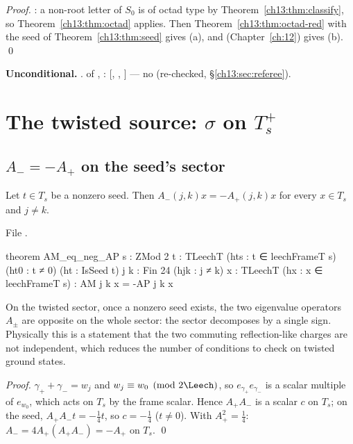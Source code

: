 \noindent\emph{Proof.} : a non-root letter of $S_0$ is of octad type by
Theorem~\ref{ch13:thm:classify}, so Theorem~\ref{ch13:thm:octad} applies. Then
Theorem~\ref{ch13:thm:octad-red} with the seed of Theorem~\ref{ch13:thm:seed} gives (a), and
 (Chapter~\ref{ch:12}) gives (b). \qed
\begin{status}
\textbf{Unconditional.} .  of ,
: [, , ] --- no 
(re-checked, \S\ref{ch13:sec:referee}).
\end{status}

\section{\texorpdfstring{The twisted source: $\sigma$ on $T_s^+$}{The twisted source: sigma on Ts+}}\label{ch13:sec:tt}

\subsection{\texorpdfstring{$A_-=-A_+$ on the seed's sector}{A-=-A+ on the seed's sector}}
\begin{lemma}\label{ch13:lem:AM-AP}
Let $t\in T_s$ be a nonzero seed. Then $A_-(j,k)x=-A_+(j,k)x$ for every $x\in T_s$ and $j\ne k$.
\end{lemma}
\noindent File .
\begin{leancode}
theorem AM_eq_neg_AP {s : ZMod 2} {t : TLeechT} (hts : t ∈ leechFrameT s) (ht0 : t ≠ 0) (ht : IsSeed t)
    {j k : Fin 24} (hjk : j ≠ k) {x : TLeechT} (hx : x ∈ leechFrameT s) : AM j k x = -AP j k x
\end{leancode}
\begin{physics}
On the twisted sector, once a nonzero seed exists, the two eigenvalue operators $A_\pm$ are opposite on the whole sector: the sector decomposes by a single sign. Physically this is a statement that the two commuting reflection-like charges are not independent, which reduces the number of conditions to check on twisted ground states.
\end{physics}
\noindent\emph{Proof.} $\gamma_++\gamma_-=w_j$ and $w_j\equiv w_0\pmod{2\Leech}$, so $e_{\gamma_+}e_{\gamma_-}$ is a scalar multiple of
$e_{w_0}$, which acts on $T_s$ by the frame scalar. Hence $A_+A_-$ is a scalar $c$ on $T_s$; on the seed,
$A_+A_-t=-\tfrac14t$, so $c=-\tfrac14$ ($t\neq0$). With $A_+^2=\tfrac14$: $A_-=4A_+(A_+A_-)=-A_+$ on $T_s$. \qed

